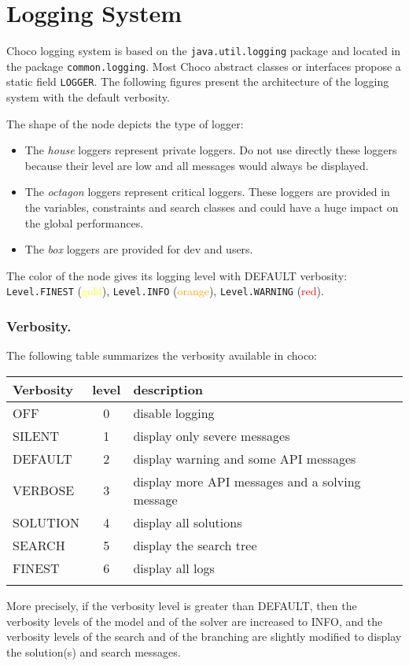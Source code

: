 \section{Logging System}\label{advanced:loggingsystem}\hypertarget{advanced:loggingsystem}{}

Choco logging system is based on the \texttt{java.util.logging} package and located in the package \texttt{common.logging}.
Most Choco abstract classes or interfaces propose a static field \texttt{LOGGER}.
The following figures present the architecture of the logging system with the default verbosity.


The shape of the node depicts the type of logger:
\begin{itemize}
	\item The \emph{house} loggers represent private loggers. Do not use directly these loggers because their level are low and all messages would always be displayed.
	\item The \emph{octagon} loggers represent critical loggers. These loggers are provided in the variables, constraints and search classes and could have a huge impact on the global performances.
	\item The \emph{box} loggers are provided for dev and users.
\end{itemize}
The color of the node gives its logging level with DEFAULT verbosity:
\texttt{Level.FINEST} (\textcolor{yellow}{gold}),
\texttt{Level.INFO} (\textcolor{orange}{orange}),
\texttt{Level.WARNING} (\textcolor{red}{red}).

\subsubsection{Verbosity.}\label{advanced:verbosity}\hypertarget{advanced:verbosity}{}
The following table summarizes the verbosity available in choco: 
\begin{center}
 	\begin{tabular}{l c l}
      \hline
      Verbosity &level & description \\
      \hline
		 OFF &0 &  disable logging \\
		 SILENT &1 &  display only severe messages \\
		 DEFAULT &2 &  display warning and some API messages \\
		 VERBOSE &3 &  display more API messages and a solving message \\
		 SOLUTION &4 &  display all solutions \\
		 SEARCH &5 &  display the search tree \\
		 FINEST &6 &  display all logs\\
         \hline\\
	\end{tabular}
\end{center}
More precisely, if the verbosity level is greater than DEFAULT, then the verbosity levels of the model and of the solver are increased to INFO, and the verbosity levels of the search and of the branching are slightly modified to display the solution(s) and search messages.

